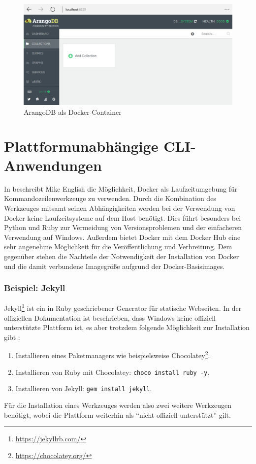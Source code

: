 \begin{figure}[htbp]
    \centering
    \includegraphics[width=0.9\linewidth,clip]{images/arangodb-demo}
    \caption{ArangoDB als Docker-Container}
\label{fig:arangodb-demo}
\end{figure}

\section{Plattformunabhängige CLI-Anwendungen}
\label{sec:cross-platform-applications}
In \autocite{docker-cli-tools:online} beschreibt Mike English die Möglichkeit, Docker als Laufzeitumgebung für Kommandozeilenwerkzeuge zu verwenden.
Durch die Kombination des Werkzeuges mitsamt seinen Abhängigkeiten werden bei der Verwendung von Docker keine Laufzeitsysteme auf dem Host benötigt.
Dies führt besonders bei Python und Ruby zur Vermeidung von Versionsproblemen und der einfacheren Verwendung auf Windows.
Außerdem bietet Docker mit dem Docker Hub eine sehr angenehme Möglichkeit für die Veröffentlichung und Verbreitung.
Dem gegenüber stehen die Nachteile der Notwendigkeit der Installation von Docker und die damit verbundene Imagegröße aufgrund der Docker-Basisimages.

\subsubsection{Beispiel: Jekyll}
Jekyll\footnote{\url{https://jekyllrb.com/}} ist ein in Ruby geschriebener Generator für statische Webseiten.
In der offiziellen Dokumentation ist beschrieben, dass Windows keine offiziell unterstützte Plattform ist, es aber trotzdem folgende Möglichkeit zur Installation gibt \autocite{jekyll-windows:online}:
\begin{enumerate}
    \item Installieren eines Paketmanagers wie beispielsweise Chocolatey\footnote{\url{https://chocolatey.org/}}.
    \item Installieren von Ruby mit Chocolatey: \texttt{choco install ruby -y}.
    \item Installieren von Jekyll: \texttt{gem install jekyll}.
\end{enumerate}
Für die Installation eines Werkzeuges werden also zwei weitere Werkzeugen benötigt, wobei die Plattform weiterhin als "`nicht offiziell unterstützt"' gilt.


